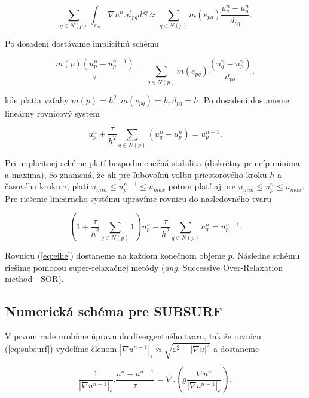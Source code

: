 \documentclass[a4paper,11pt,oneside]{article}%
\def\epsilon{\varepsilon}
\begin{document}
\begin{equation}
\sum_{q\in N(p)} \int_{e_{pq}} \nabla u^n . \vec{n}_{pq} dS \approx \sum_{q\in N(p)} m(e_{pq})\frac{u^n_q - u^n_p}{d_{pq}}.
\end{equation}

Po dosadení dostávame implicitnú schému  

\begin{equation}
\frac{m(p)(u_p^n -u_p^{n - 1})}{\tau} = \sum_{q \in N(p)} m(e_{pq})\frac{(u_q^n - u_p^n)}{d_{pq}},
\end{equation}

kde platia vzťahy $m(p) = h^2, m(e_{pq}) = h, d_{pq} = h$. Po dosadení dostaneme lineárny rovnicový systém

\begin{equation}
u_p^n + \frac{\tau}{h^2}\sum_{q \in N(p)} (u_q^n - u_p^n) = u_p^{n - 1}.
\end{equation}

Pri implicitnej schéme platí bezpodmienečná stabilita (diskrétny princíp minima a maxima), čo znamená, že ak pre ľubovoľnú voľbu priestorového kroku $h$ a časového kroku $\tau$, platí $u_{min} \leq u_p^{n - 1} \leq u_{max}$ potom platí aj pre $u_{min} \leq u_p^{n} \leq u_{max}$. Pre riešenie lineárneho systému upravíme rovnicu do nasledovného tvaru

\begin{equation} \label{eq:eihe}
\left(1 + \frac{\tau}{h^2} \sum_{q \in N(p)}1\right)u_p^n - \frac{\tau}{h^2} \sum_{q \in N(p)}u_q^n = u_p^{n - 1}.
\end{equation}

Rovnicu (\ref{eq:eihe}) dostaneme na každom konečnom objeme $p$. Následne schému riešime pomocou super-relaxačnej metódy (\textit{ang.} Successive Over-Relaxation method - SOR). 

\subsection{Numerická schéma pre SUBSURF}

V prvom rade urobíme úpravu do divergentného tvaru, tak že rovnicu (\ref{eq:subsurf}) vydelíme členom $|\nabla u^{n-1}|_{\epsilon} \approx \sqrt{\epsilon^2 + |\nabla u|^2}$ a dostaneme

\begin{equation} \label{eq:cdsubsurf}
\frac{1}{|\nabla u^{n-1}|_{\epsilon}}.\frac{u^n-u^{n-1}}{\tau} = \nabla.\left(g\frac{\nabla u^n}{|\nabla u^{n-1}|_{\epsilon}}\right),
\end{equation}
\end{document}
